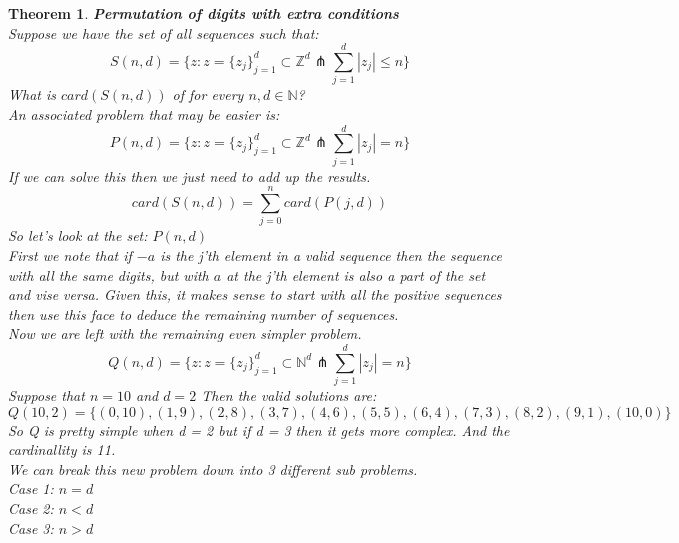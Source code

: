 \documentclass[12pt]{extarticle}
\theoremstyle{plain}
\newtheorem{thm}{Theorem}[section]
\theoremstyle{plain}
\theoremstyle{plain}
\theoremstyle{Definition}
\theoremstyle{Definition}
\theoremstyle{plain}
\theoremstyle{plain}
\newcommand{\cut}[0]{\noindent\framebox[\linewidth]{\rule{\linewidth}{2pt}}\\}
\begin{document}
\begin{thm} \textbf{Permutation of digits with extra conditions} \\
	Suppose we have the set of all sequences such that: 
	$$S(n,d) = \{z : z = \{z_j\}_{j=1}^d \subset \mathbb{Z}^d \pitchfork \sum_{j=1}^d |z_j| \leq n \}$$ 
	What is $card(S(n,d))$ of for every $n,d \in \mathbb{N}$? \\
	An associated problem that may be easier is: \\ 
	$$P(n,d) = \{z : z = \{z_j\}_{j=1}^d \subset \mathbb{Z}^d \pitchfork \sum_{j=1}^d |z_j| = n \}$$ 
	If we can solve this then we just need to add up the results. \\ 
	$$card(S(n,d)) = \sum_{j=0}^n card(P(j,d))$$
	So let's look at the set: 
	$P(n,d)$ \\ 
	First we note that if $-a$ is the j'th element in a valid sequence then the sequence with all the same digits, but with $a$ at the j'th element is also a part of the set and vise versa.  
	Given this, it makes sense to start with all the positive sequences then use this face to deduce the remaining number of sequences. \\
	Now we are left with the remaining even simpler problem. \\ 
	$$Q(n,d) = \{z : z = \{z_j\}_{j=1}^d \subset \mathbb{N}^d \pitchfork \sum_{j=1}^d |z_j| = n \}$$ 	
	Suppose that $n = 10$ and $d = 2$
	Then the valid solutions are: \\ 
	$$Q(10,2) = \{(0,10),(1,9),(2,8),(3,7),(4,6),(5,5),(6,4),(7,3),(8,2),(9,1),(10,0)\}$$
	So Q is pretty simple when d = 2 but if d = 3 then it gets more complex. 
	And the cardinallity is 11. \\ 
	We can break this new problem down into 3 different sub problems. \\ 
	Case 1: $n = d$ \\
	Case 2: $n < d$ \\ 
	Case 3: $n > d$ \\ 
\end{thm}

\cut
\end{document}
